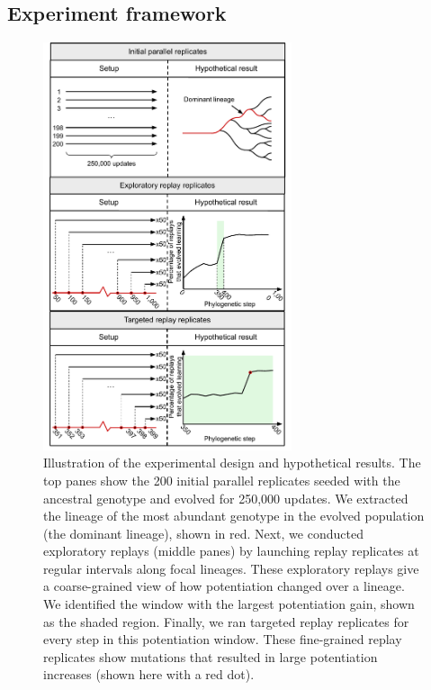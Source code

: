 \subsection{Experiment framework}

\begin{figure}[h!]
\begin{center}
\includegraphics[width=0.65\textwidth]{03_learning_case_studies/media/conceptual_figure.pdf}
\caption{
    Illustration of the experimental design and hypothetical results.
    The top panes show the 200 initial parallel replicates seeded with the ancestral genotype and evolved for 250,000 updates.
    We extracted the lineage of the most abundant genotype in the evolved population (the dominant lineage), shown in red. 
    Next, we conducted exploratory replays (middle panes) by launching replay replicates at regular intervals along focal lineages. 
    These exploratory replays give a coarse-grained view of how potentiation changed over a lineage. 
    We identified the window with the largest potentiation gain, shown as the shaded region.
    Finally, we ran targeted replay replicates for every step in this potentiation window. 
    These fine-grained replay replicates show mutations that resulted in large potentiation increases (shown here with a red dot). 
}
\label{fig-conceptual}
\end{center}
\end{figure}

